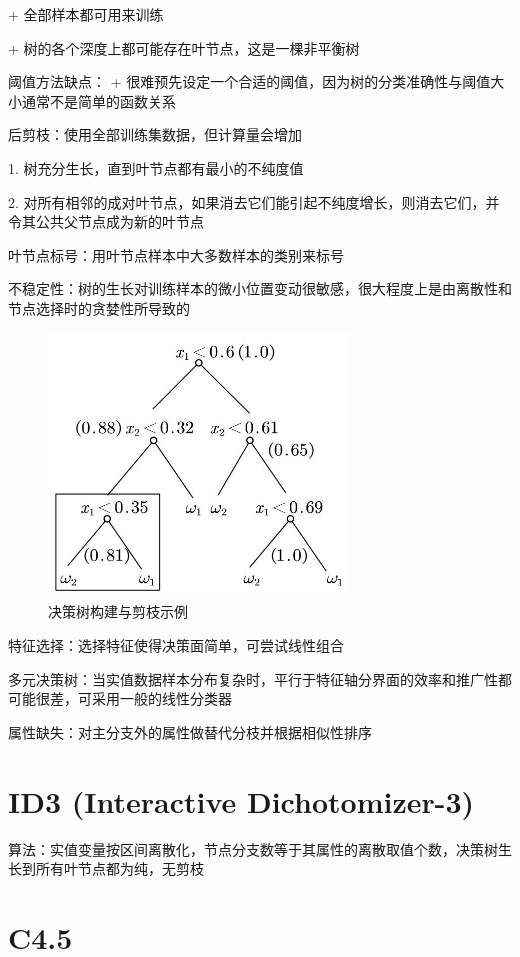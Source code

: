 \documentclass[openany,a4paper,12pt]{ctexbook}
\theoremstyle{kaiti}
\theoremstyle{normal}
\begin{document}
+ 全部样本都可用来训练

+ 树的各个深度上都可能存在叶节点，这是一棵非平衡树

阈值方法缺点：
+ 很难预先设定一个合适的阈值，因为树的分类准确性与阈值大小通常不是简单的函数关系

后剪枝：使用全部训练集数据，但计算量会增加

1. 树充分生长，直到叶节点都有最小的不纯度值

2. 对所有相邻的成对叶节点，如果消去它们能引起不纯度增长，则消去它们，并令其公共父节点成为新的叶节点

叶节点标号：用叶节点样本中大多数样本的类别来标号

不稳定性：树的生长对训练样本的微小位置变动很敏感，很大程度上是由离散性和节点选择时的贪婪性所导致的

\begin{figure}
  \centering
  \includegraphics[width=8cm]{1627808769097-11.2(1).jpg}
  \caption{决策树构建与剪枝示例}
\end{figure}

特征选择：选择特征使得决策面简单，可尝试线性组合

多元决策树：当实值数据样本分布复杂时，平行于特征轴分界面的效率和推广性都可能很差，可采用一般的线性分类器

属性缺失：对主分支外的属性做替代分枝并根据相似性排序

\section{ID3 (Interactive Dichotomizer-3)}

算法：实值变量按区间离散化，节点分支数等于其属性的离散取值个数，决策树生长到所有叶节点都为纯，无剪枝

\section{C4.5}
\end{document}
